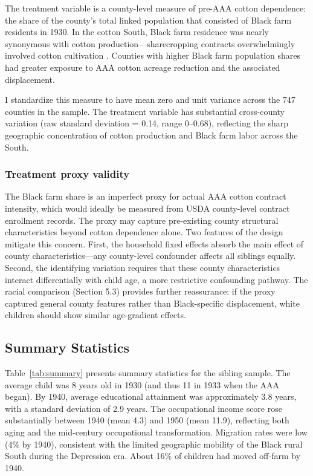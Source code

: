 \documentclass[12pt]{article}
\begin{document}
The treatment variable is a county-level measure of pre-AAA cotton dependence: the share of the county's total linked population that consisted of Black farm residents in 1930. In the cotton South, Black farm residence was nearly synonymous with cotton production---sharecropping contracts overwhelmingly involved cotton cultivation \citep{wright1986old, ransom2001one}. Counties with higher Black farm population shares had greater exposure to AAA cotton acreage reduction and the associated displacement.

I standardize this measure to have mean zero and unit variance across the 747 counties in the sample. The treatment variable has substantial cross-county variation (raw standard deviation = 0.14, range 0--0.68), reflecting the sharp geographic concentration of cotton production and Black farm labor across the South.

\subsubsection*{Treatment proxy validity} The Black farm share is an imperfect proxy for actual AAA cotton contract intensity, which would ideally be measured from USDA county-level contract enrollment records. The proxy may capture pre-existing county structural characteristics beyond cotton dependence alone. Two features of the design mitigate this concern. First, the household fixed effects absorb the main effect of county characteristics---any county-level confounder affects all siblings equally. Second, the identifying variation requires that these county characteristics interact differentially with child age, a more restrictive confounding pathway. The racial comparison (Section 5.3) provides further reassurance: if the proxy captured general county features rather than Black-specific displacement, white children should show similar age-gradient effects.

\subsection{Summary Statistics}



Table~\ref{tab:summary} presents summary statistics for the sibling sample. The average child was 8 years old in 1930 (and thus 11 in 1933 when the AAA began). By 1940, average educational attainment was approximately 3.8 years, with a standard deviation of 2.9 years. The occupational income score rose substantially between 1940 (mean 4.3) and 1950 (mean 11.9), reflecting both aging and the mid-century occupational transformation. Migration rates were low (4\% by 1940), consistent with the limited geographic mobility of the Black rural South during the Depression era. About 16\% of children had moved off-farm by 1940.
\end{document}
